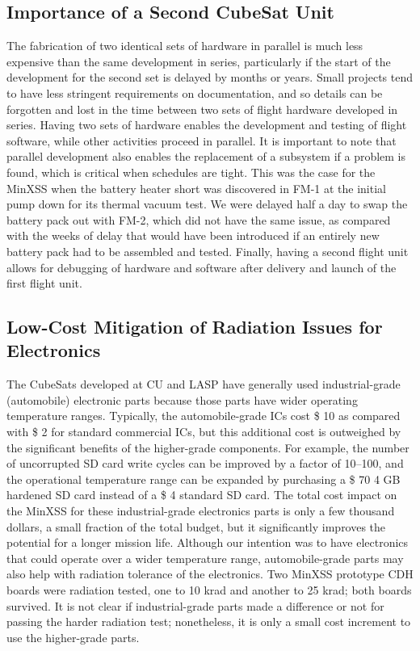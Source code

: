 \subsection{Importance of a Second CubeSat Unit}
The fabrication of two identical sets of hardware in parallel is much less expensive than the same development in series, particularly if the start of the development for the second set is delayed by months or years. Small projects tend to have less stringent requirements on documentation, and so details can be forgotten and lost in the time between two sets of flight hardware developed in series. Having two sets of hardware enables the development and testing of flight software, while other activities proceed in parallel. It is important to note that parallel development also enables the replacement of a subsystem if a problem is found, which is critical when schedules are tight. This was the case for the MinXSS when the battery heater short was discovered in FM-1 at the initial pump down for its thermal vacuum test. We were delayed half a day to swap the battery pack out with FM-2, which did not have the same issue, as compared with the weeks of delay that would have been introduced if an entirely new battery pack had to be assembled and tested. Finally, having a second flight unit allows for debugging of hardware and software after delivery and launch of the first flight unit.

\subsection{Low-Cost Mitigation of Radiation Issues for Electronics}
The CubeSats developed at CU and LASP have generally used industrial-grade (automobile) electronic parts because those parts have wider operating temperature ranges. Typically, the automobile-grade ICs cost \$ 10 as compared with \$ 2 for standard commercial ICs, but this additional cost is outweighed by the significant benefits of the higher-grade components. For example, the number of uncorrupted SD card write cycles can be improved by a factor of 10–100, and the operational temperature range can be expanded by purchasing a \$ 70 4 GB hardened SD card instead of a \$ 4 standard SD card. The total cost impact on the MinXSS for these industrial-grade electronics parts is only a few thousand dollars, a small fraction of the total budget, but it significantly improves the potential for a longer mission life. Although our intention was to have electronics that could operate over a wider temperature range, automobile-grade parts may also help with radiation tolerance of the electronics. Two MinXSS prototype CDH boards were radiation tested, one to 10 krad and another to 25 krad; both boards survived. It is not clear if industrial-grade parts made a difference or not for passing the harder radiation test; nonetheless, it is only a small cost increment to use the higher-grade parts.

